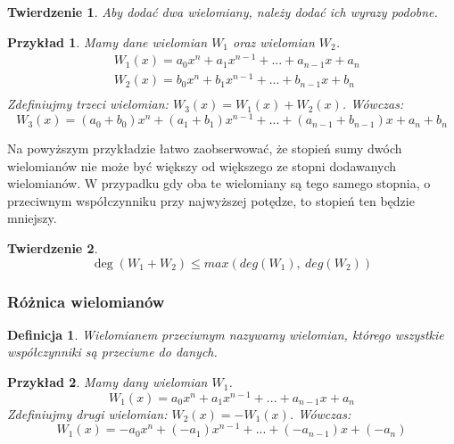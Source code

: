 \documentclass[twoside,a4paper]{book}
\newtheorem{theorem}{Twierdzenie}
\newtheorem{definition}{Definicja}
\newtheorem{example}{Przykład}
\begin{document}
\begin{theorem}
	Aby dodać dwa wielomiany, należy dodać ich wyrazy podobne.
\end{theorem}
\begin{example}
	Mamy dane wielomian $W_1$ oraz wielomian $W_2$.
	\begin{equation}
		\begin{split}
			&W_1(x) = a_0x^n + a_1x^{n-1} + ... + a_{n-1}x + a_n \\
			&W_2(x) = b_0x^n + b_1x^{n-1} + ... + b_{n-1}x + b_n \\
		\end{split}
	\end{equation}
	Zdefiniujmy trzeci wielomian: $W_3(x) = W_1(x) + W_2(x)$. Wówczas:
	\begin{equation}
		W_3(x) = (a_0+b_0)x^n + (a_1+b_1)x^{n-1} + ... + (a_{n-1} + b_{n-1})x + a_n + b_n
	\end{equation}
\end{example}

Na powyższym przykładzie łatwo zaobserwować, że stopień sumy dwóch wielomianów nie może być większy od większego ze stopni dodawanych wielomianów. W przypadku gdy oba te wielomiany są tego samego stopnia, o przeciwnym współczynniku przy najwyższej potędze, to stopień ten będzie mniejszy.

\begin{theorem}
	\begin{equation}
		\deg(W_1 + W_2) \le max(deg(W_1),\ deg (W_2))
	\end{equation}
\end{theorem}

\subsubsection{Różnica wielomianów}

\begin{definition}
	Wielomianem przeciwnym nazywamy wielomian, którego wszystkie współczynniki są przeciwne do danych.
\end{definition}

\begin{example}
	Mamy dany wielomian $W_1$.
	\begin{equation}
		W_1(x) = a_0x^n + a_1x^{n-1} + ... + a_{n-1}x + a_n
	\end{equation}
	Zdefiniujmy drugi wielomian: $W_2(x) = -W_1(x)$. Wówczas:
	\begin{equation}
		W_1(x) = -a_0x^n + (-a_1)x^{n-1} + ... + (-a_{n-1})x + (-a_n)
	\end{equation}
\end{example}
\end{document}
